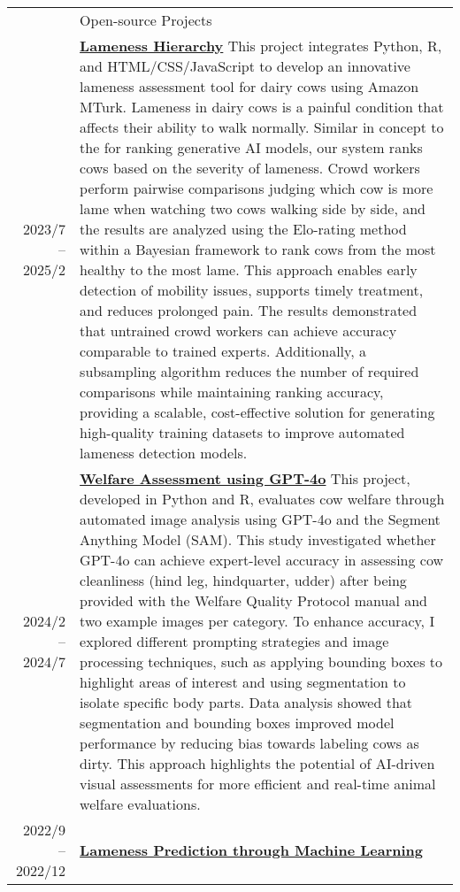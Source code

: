\documentclass[letterpaper, 11pt]{article}
\newcommand{\socialicon}[1]{\raisebox{-0.05em}{\resizebox{!}{1em}{#1}}}
\newcommand{\headingfont}{\Large\color{OliveGreen}}
\newenvironment{SectionTable}[1]{
	\renewcommand*{\arraystretch}{1.7}
	\setlength{\tabcolsep}{10pt}
	\begin{longtable}{Rp{5.2in}} & #1 \\}
{\end{longtable}\vspace{-.3cm}}
\begin{document}
\begin{SectionTable}{\headingfont Open-source Projects}
2023/7 -- 2025/2 &
\textbf{\href{https://github.com/skysheng7/lameness_hierarchy}{Lameness Hierarchy}} \socialicon{\faGithub} \newline
This project integrates Python, R, and HTML/CSS/JavaScript to develop an innovative lameness assessment tool for dairy cows using Amazon MTurk. Lameness in dairy cows is a painful condition that affects their ability to walk normally. Similar in concept to the  for ranking generative AI models, our system ranks cows based on the severity of lameness. Crowd workers perform pairwise comparisons judging which cow is more lame when watching two cows walking side by side, and the results are analyzed using the Elo-rating method within a Bayesian framework to rank cows from the most healthy to the most lame. This approach enables early detection of mobility issues, supports timely treatment, and reduces prolonged pain. The results demonstrated that untrained crowd workers can achieve accuracy comparable to trained experts. Additionally, a subsampling algorithm reduces the number of required comparisons while maintaining ranking accuracy, providing a scalable, cost-effective solution for generating high-quality training datasets to improve automated lameness detection models.\\
2024/2 -- 2024/7 &
\textbf{\href{https://github.com/skysheng7/welfare_assess_GPT4o}{Welfare Assessment using GPT-4o}} \socialicon{\faGithub} \newline
This project, developed in Python and R, evaluates cow welfare through automated image analysis using GPT-4o and the Segment Anything Model (SAM). This study investigated whether GPT-4o can achieve expert-level accuracy in assessing cow cleanliness (hind leg, hindquarter, udder) after being provided with the Welfare Quality Protocol manual and two example images per category. To enhance accuracy, I explored different prompting strategies and image processing techniques, such as applying bounding boxes to highlight areas of interest and using segmentation to isolate specific body parts. Data analysis showed that segmentation and bounding boxes improved model performance by reducing bias towards labeling cows as dirty. This approach highlights the potential of AI-driven visual assessments for more efficient and real-time animal welfare evaluations. \\
2022/9 -- 2022/12 &
\textbf{\href{https://github.com/skysheng7/Lameness-prediction-ML.git}{Lameness Prediction through Machine Learning}} \socialicon{\faGithub} \newline

\end{SectionTable}
\end{document}
